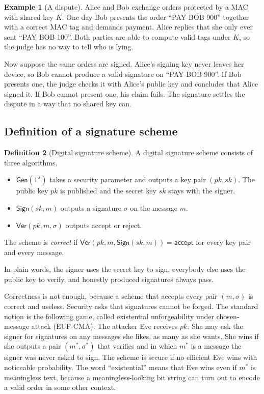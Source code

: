 \documentclass[11pt,a4paper]{article}
\theoremstyle{definition}
\newtheorem{definition}{Definition}[section]
\newtheorem{example}[definition]{Example}
\newcommand{\Gen}{\mathsf{Gen}}
\newcommand{\Sign}{\mathsf{Sign}}
\newcommand{\Ver}{\mathsf{Ver}}
\newcommand{\sk}{\mathit{sk}}
\newcommand{\pk}{\mathit{pk}}
\begin{document}
\begin{example}[A dispute]\label{ex:dispute}
Alice and Bob exchange orders protected by a MAC with shared key $K$. One day Bob presents the order ``PAY BOB 900'' together with a correct MAC tag and demands payment. Alice replies that she only ever sent ``PAY BOB 100''. Both parties are able to compute valid tags under $K$, so the judge has no way to tell who is lying.

Now suppose the same orders are signed. Alice's signing key never leaves her device, so Bob cannot produce a valid signature on ``PAY BOB 900''. If Bob presents one, the judge checks it with Alice's public key and concludes that Alice signed it. If Bob cannot present one, his claim fails. The signature settles the dispute in a way that no shared key can.
\end{example}

\subsection{Definition of a signature scheme}

\begin{definition}[Digital signature scheme]
A digital signature scheme consists of three algorithms.
\begin{itemize}
\item $\Gen(1^\lambda)$ takes a security parameter and outputs a key pair $(\pk,\sk)$. The public key $\pk$ is published and the secret key $\sk$ stays with the signer.
\item $\Sign(\sk, m)$ outputs a signature $\sigma$ on the message $m$.
\item $\Ver(\pk, m, \sigma)$ outputs \textsf{accept} or \textsf{reject}.
\end{itemize}
The scheme is \emph{correct} if $\Ver(\pk, m, \Sign(\sk,m)) = \textsf{accept}$ for every key pair and every message.
\end{definition}

In plain words, the signer uses the secret key to sign, everybody else uses the public key to verify, and honestly produced signatures always pass.

Correctness is not enough, because a scheme that accepts every pair $(m,\sigma)$ is correct and useless. Security asks that signatures cannot be forged. The standard notion is the following game, called existential unforgeability under chosen-message attack (EUF-CMA). The attacker Eve receives $\pk$. She may ask the signer for signatures on any messages she likes, as many as she wants. She wins if she outputs a pair $(m^*,\sigma^*)$ that verifies and in which $m^*$ is a message the signer was never asked to sign. The scheme is secure if no efficient Eve wins with noticeable probability. The word ``existential'' means that Eve wins even if $m^*$ is meaningless text, because a meaningless-looking bit string can turn out to encode a valid order in some other context.
\end{document}
